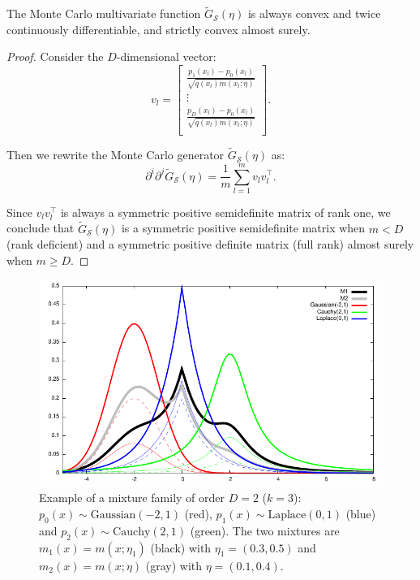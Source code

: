 \documentclass[graybox]{svmult}
\def\tildeG{\tilde{G}}
\def\calS{\mathcal{S}}
\begin{document}
\begin{theorem}\label{thm:MCMF}
The Monte Carlo multivariate function $\tildeG_\calS(\eta)$ is always convex and twice continuously differentiable, and strictly convex  almost surely.
\end{theorem}

\begin{proof}
Consider the $D$-dimensional vector:
\begin{equation}
v_l = \left[
\begin{array}{c}  
\frac{p_1(x_l)-p_0(x_l)}{\sqrt{q(x_l) m(x_l;\eta)}}\\
\vdots\\
\frac{p_D(x_l)-p_0(x_l)}{\sqrt{q(x_l) m(x_l;\eta)}}\\
\end{array}
\right].
\end{equation}

Then we rewrite the Monte Carlo generator $\tildeG_\calS(\eta)$ as: 
\begin{equation}
\partial^i \partial^j \tildeG_\calS(\eta) =   \frac{1}{m} \sum_{l=1}^m v_l v_l^\top.
\end{equation}

Since $v_l v_l^\top$ is always a symmetric positive semidefinite matrix of rank one,
we conclude that $\tildeG_\calS(\eta) $  is a symmetric positive semidefinite matrix when $m<D$ (rank deficient) and a symmetric positive definite matrix (full rank)  almost surely when $m\geq D$.
\end{proof}
 

\begin{figure}%
\centering
\includegraphics[width=0.85\columnwidth]{GaussianLaplaceCauchy-example.pdf}%

\caption{Example of a mixture family of order $D=2$ ($k=3$): $p_0(x)\sim \mathrm{Gaussian}(-2,1)$ (red), $p_1(x)\sim \mathrm{Laplace}(0,1)$ (blue) and
 $p_2(x)\sim \mathrm{Cauchy}(2,1)$ (green). 
The two mixtures are $m_1(x)=m(x;\eta_1)$ (black) with $\eta_1=(0.3,0.5)$ and $m_2(x)=m(x;\eta)$ (gray) with $\eta=(0.1,0.4)$.
 }%
\label{fig:mmexample2D}%
\end{figure}
\end{document}
